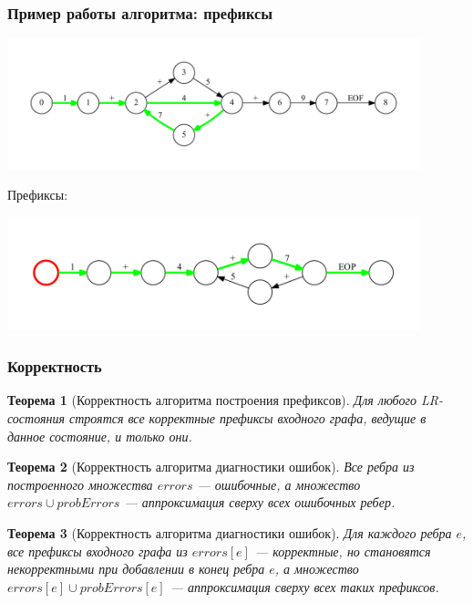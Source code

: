 \documentclass{beamer}
\newtheorem{rutheorem}{Теорема}
\begin{document}
\begin{frame}[fragile]
	\transwipe[direction=90]
	\frametitle{Пример работы алгоритма: префиксы}
	
	\includegraphics[width=340pt]{pictures/NumErrorFull.pdf}
	
	Префиксы:
	
    \includegraphics[width=340pt]{pictures/num4error.pdf}
    
\end{frame}

\begin{frame}[fragile]
  \transwipe[direction=90]
  \frametitle{Корректность}
  \begin{rutheorem}[Корректность алгоритма построения префиксов]
    Для любого LR-состояния строятся все корректные префиксы входного графа, ведущие в данное состояние, и только они.
  \end{rutheorem}

  \begin{rutheorem}[Корректность алгоритма диагностики ошибок]
   Все ребра из построенного множества $errors$ --- ошибочные, а множество $errors \cup probErrors$ --- аппроксимация сверху всех ошибочных ребер.
  \end{rutheorem}
  
  \begin{rutheorem}[Корректность алгоритма диагностики ошибок]
   Для каждого ребра $e$, все префиксы входного графа из $errors[e]$ --- корректные, но становятся некорректными при добавлении в конец ребра $e$, а множество $errors[e] \cup probErrors[e]$ --- аппроксимация сверху всех таких префиксов.
  \end{rutheorem}
  
\end{frame}
\end{document}
